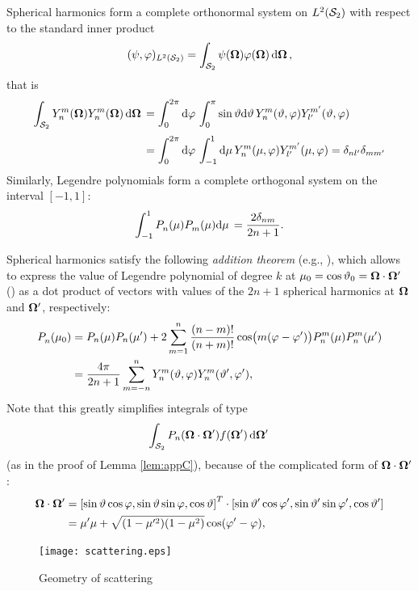 Spherical harmonics form a complete orthonormal system on $\Lp[2](\Sphere)$ with respect to the
standard inner product $$
(\psi, \varphi)_{\Lp[2](\Sphere)} = \intA{\psi(\bomega) {\varphi(\bomega)}},
$$
that is
\begin{equation}\label{eq:og}
\begin{aligned}
\intA{\Y{n}{m}(\bomega)\Yc{n}{m}(\bomega)} &=
\int_{0}^{2\pi}\d{\azimuthal}\int_{0}^{\pi}\sin\polar\d{\polar}  
\Y{n}{m}(\polar,\azimuthal)\Yc{l'}{m'}(\polar,\azimuthal)\\[.25em]
& = \int_{0}^{2\pi}\d{\azimuthal}\int_{-1}^{1}\d{\mu}
\Y{n}{m}(\mu,\azimuthal)\Yc{l'}{m'}(\mu,\azimuthal) = \kron{n}{l'}\kron{m}{m'}
\end{aligned}
\end{equation}
Similarly, Legendre polynomials form a complete orthogonal system on the interval $[-1,1]$:
$$
	\muint {\P{n}{}(\mu)\P{m}{}(\mu)} = \frac{2\kron{n}{m}}{2n + 1}.
$$

Spherical harmonics satisfy the
following \textit{addition theorem} (e.g., \cite[Remark 3.88]{Schreiner}), which allows to express the value of Legendre
polynomial of degree $k$ at $\mu_0 = \cos\polar_0 = \bomega\cdot\bomega'$ () as a dot product of
vectors with values of the $2n+1$ spherical harmonics at $\bomega$ and $\bomega'$, respectively:
\begin{align}
\P{n}{}(\mu_0)
&=P_n(\mu) P_n(\mu')+2 \sum _{m = 1}^n \frac{(n-m)!}{(n+m)!} \cos \bigl(m(\azimuthal - \azimuthal')\bigr) P_n^m(\mu) P_n^m(\mu')\nonumber\\
&=\frac{4\pi}{2n+1}\suma[m]{-n}{n}\Y{n}{m}(\polar,\azimuthal)\Yc{n}{m}(\polar',\azimuthal'),
\label{eq:additionThm}
\end{align}
Note that this greatly simplifies integrals of type
$$
\intA[']{P_n(\bomega\cdot\bomega')f(\bomega')}
$$
(as in the proof of Lemma \ref{lem:appC}), because of the complicated form of $\bomega\cdot\bomega'$:
$$
\begin{aligned}
	\bomega\cdot\bomega' 
&= \lvect{\sint\cosp,\sint\sinp,\cost} \cdot \lvec{\sint'\cosp',\sint'\sinp',\cost'} \\
& = \mu'\mu + \sqrt{(1-\mu'^2)(1-\mu^2)}\cos(\azimuthal' - \azimuthal),
\end{aligned}
$$
\begin{figure}[!hbt]
    \centering
    \texttt{[image: scattering.eps]}
    \caption[Scattering]{Geometry of scattering}
    \label{fig:scatter}
\end{figure}

